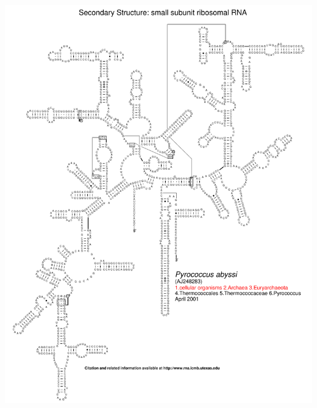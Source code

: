 \documentclass[landscape]{slides}
\begin{document}
\begin{slide}\begin{center}\includegraphics[height=8in]{figs/arc-15}\end{center}\vfill\end{slide}
\end{document}
